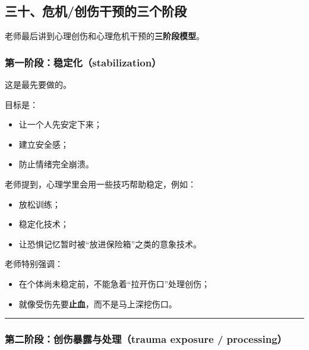 \documentclass[
  chinese,
  9pt,
  a4paper,
]{ctexart}
\providecommand{\tightlist}{%
  \setlength{\itemsep}{0pt}\setlength{\parskip}{0pt}}
\begin{document}
\subsection{三十、危机/创伤干预的三个阶段}\label{ux4e09ux5341ux5371ux673aux521bux4f24ux5e72ux9884ux7684ux4e09ux4e2aux9636ux6bb5}

老师最后讲到心理创伤和心理危机干预的\textbf{三阶段模型}。

\subsubsection{第一阶段：稳定化（stabilization）}\label{ux7b2cux4e00ux9636ux6bb5ux7a33ux5b9aux5316stabilization}

这是最先要做的。

目标是：

\begin{itemize}
\tightlist
\item
  让一个人先安定下来；
\item
  建立安全感；
\item
  防止情绪完全崩溃。
\end{itemize}

老师提到，心理学里会用一些技巧帮助稳定，例如：

\begin{itemize}
\tightlist
\item
  放松训练；
\item
  稳定化技术；
\item
  让恐惧记忆暂时被``放进保险箱''之类的意象技术。
\end{itemize}

老师特别强调：

\begin{itemize}
\tightlist
\item
  在个体尚未稳定前，不能急着``拉开伤口''处理创伤；
\item
  就像受伤先要\textbf{止血}，而不是马上深挖伤口。
\end{itemize}

\begin{center}\rule{0.5\linewidth}{0.5pt}\end{center}

\subsubsection{第二阶段：创伤暴露与处理（trauma exposure /
processing）}\label{ux7b2cux4e8cux9636ux6bb5ux521bux4f24ux66b4ux9732ux4e0eux5904ux7406trauma-exposure-processing}
\end{document}
